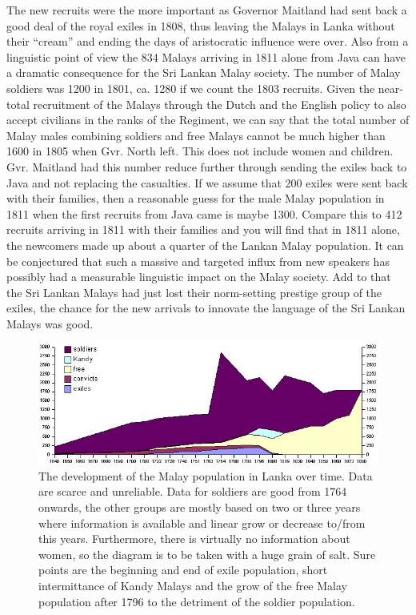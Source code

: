 The new recruits were the more important as Governor Maitland had
sent back a good deal of the royal exiles in 1808, thus leaving
the Malays in Lanka without their ``cream'' and ending the days of
aristocratic influence were over. Also from a linguistic point of
view the 834 Malays arriving in 1811 alone from Java can have a
dramatic consequence for the Sri Lankan Malay society. The number
of Malay soldiers was 1200 in 1801, ca. 1280 if we count the 1803
recruits. Given the near-total recruitment of the Malays through
the  Dutch and the English policy to also accept civilians in  the
ranks of the Regiment, we can say that the total number of Malay
males combining soldiers and free Malays cannot be much higher
than 1600 in 1805 when Gvr. North left. This does not include
women and children.  Gvr. Maitland had this  number reduce further
through sending the exiles back to Java and not replacing the
casualties. If we assume that 200 exiles were sent back with their
families, then a reasonable guess for the male Malay population in
1811 when the first recruits from Java came is maybe 1300. Compare
this to 412 recruits arriving in 1811 with their families and you
will find that in 1811 alone, the newcomers made up about a
quarter of the Lankan Malay population. It can be conjectured that
such a massive and targeted \kuckn influx from new speakers has
possibly had a measurable  linguistic impact on the Malay society.
Add to that the Sri Lankan Malays had just lost their norm-setting
prestige group of the exiles, the chance for the new arrivals to
innovate the language of the Sri Lankan Malays was good.

\begin{figure}
	\centering
		\includegraphics[width=1.00\textwidth]{pics/malaypopovertime}
	\caption[Development of the Malay population in Lanka over time]{The development of the Malay population in Lanka over time. Data are scarce and unreliable. Data for soldiers are good from 1764 onwards, the other groups are mostly based on two or three years where information is available and linear grow or decrease to/from this years. Furthermore, there is virtually no information about women, so the diagram is to be taken with a huge grain of salt. Sure points are the beginning and end of exile population, short intermittance of Kandy Malays and the grow of the free Malay population after 1796 to the detriment of the soldier population.}
	\label{fig:malaypopovertime}
\end{figure}


